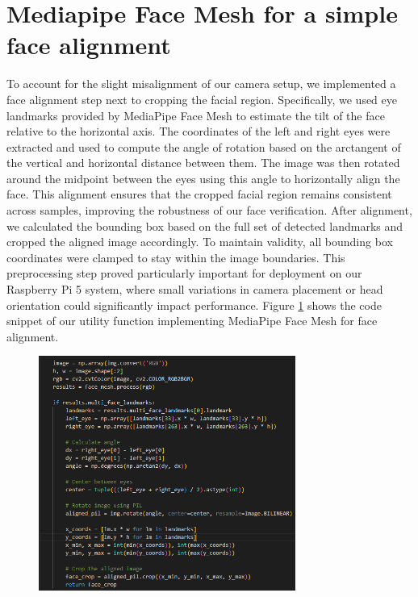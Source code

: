 \section{Mediapipe Face Mesh for a simple face alignment}
To account for the slight misalignment of our camera setup, we implemented a face alignment step next to cropping the facial region. Specifically, we used eye landmarks provided by MediaPipe Face Mesh to estimate the tilt of the face relative to the horizontal axis. The coordinates of the left and right eyes were extracted and used to compute the angle of rotation based on the arctangent of the vertical and horizontal distance between them. The image was then rotated around the midpoint between the eyes using this angle to horizontally align the face. 
This alignment ensures that the cropped facial region remains consistent across samples, improving the robustness of our face verification. After alignment, we calculated the bounding box based on the full set of detected landmarks and cropped the aligned image accordingly. To maintain validity, all bounding box coordinates were clamped to stay within the image boundaries. This preprocessing step proved particularly important for deployment on our Raspberry Pi 5 system, where small variations in camera placement or head orientation could significantly impact performance. Figure \ref{fig:mp_face_mesh} shows the code snippet of our utility function implementing MediaPipe Face Mesh for face alignment. 
\begin{figure}[h] %
	\centering
	\includegraphics[width=0.75\textwidth]{figures/chapter4/mp_face_mesh.png} %
	\caption{}
	\label{fig:mp_face_mesh}
\end{figure}



